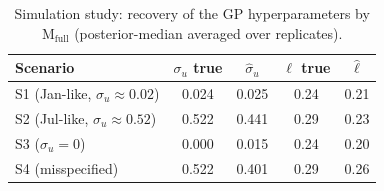 \begin{table}[h!]
  \caption{Simulation study: recovery of the GP hyperparameters by
           $\mathrm{M_{full}}$ (posterior-median averaged over replicates).}
  \label{tab:sim_gp}
  \centering
  \begin{tabular}{lcccc}
    \toprule
    Scenario & $\sigma_u$ true & $\hat{\sigma}_u$ & $\ell$ true & $\hat{\ell}$ \\
    \midrule
    S1 (Jan-like, $\sigma_u\!\approx\!0.02$) & 0.024 & 0.025 & 0.24 & 0.21 \\
    S2 (Jul-like, $\sigma_u\!\approx\!0.52$) & 0.522 & 0.441 & 0.29 & 0.23 \\
    S3 ($\sigma_u\!=\!0$) & 0.000 & 0.015 & 0.24 & 0.20 \\
    S4 (misspecified) & 0.522 & 0.401 & 0.29 & 0.26 \\
    \bottomrule
  \end{tabular}
\end{table}
